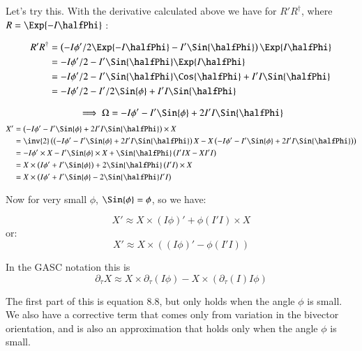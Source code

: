 Let's try this.  With the derivative calculated above we have for $R'R^\dagger$, where $R = \Exp{-I \halfPhi}$ :

\begin{align*}
R'R^\dagger 
&= \left(-I \phi'/2 \Exp{ -I \halfPhi } - I' \Sin{\halfPhi} \right)\Exp{ I \halfPhi } \\ 
&= -I \phi'/2 - I' \Sin{\halfPhi} \Exp{ I \halfPhi } \\
&= -I \phi'/2 - I' \Sin{\halfPhi}\Cos{\halfPhi} + I'I \Sin{\halfPhi} \\
&= -I \phi'/2 - I'/2 \Sin{\phi} + I'I \Sin{\halfPhi} \\
\end{align*}

\[
\implies
\Omega = -I \phi' - I' \Sin{\phi} + 2 I'I \Sin{\halfPhi}
\]
\begin{align*}
X'
&= \left( -I \phi' - I' \Sin{\phi} + 2 I'I \Sin{\halfPhi} \right) \times X \\
&= \inv{2} \left( \left( -I \phi' - I' \Sin{\phi} + 2 I'I \Sin{\halfPhi} \right) X - X \left( -I \phi' - I' \Sin{\phi} + 2 I'I \Sin{\halfPhi} \right) \right) \\
&= -I \phi' \times X  - I'\Sin{\phi} \times X + \Sin{\halfPhi} \left( I'I X - X I' I \right)  \\
&= X \times \left(I \phi' + I'\Sin{\phi} \right ) + 2 \Sin{\halfPhi} \left( I'I \right) \times X \\
&= X \times \left(I \phi' + I'\Sin{\phi} - 2 \Sin{\halfPhi} I'I \right) \\
\end{align*}

Now for very small $\phi$, $\Sin{\phi} = \phi$, so we have:

\[
X' \approx X \times (I \phi)' + \phi ( I'I ) \times X
\]
or:
\[
X' \approx X \times \left( (I \phi)' - \phi ( I'I ) \right)
\]

In the GASC notation this is
\[
\partial_\tau X \approx X \times \partial_\tau (I \phi) - X \times (\partial_\tau(I) I \phi)
\]

The first part of this is equation 8.8, but only holds when the angle $\phi$ is small.  We also have a corrective term that comes only from variation in the bivector orientation, and is also an approximation that holds only when the angle $\phi$ is small.

